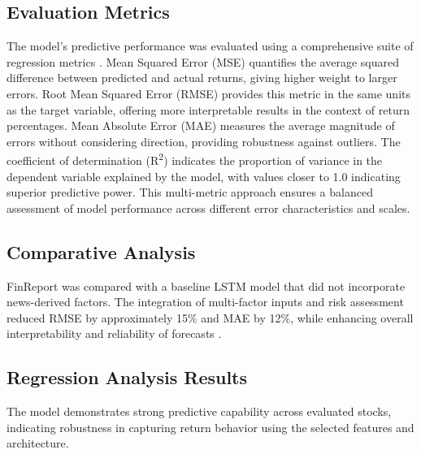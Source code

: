 \documentclass[3p,times,procedia]{elsarticle}
\begin{document}
\subsection{Evaluation Metrics}
The model's predictive performance was evaluated using a comprehensive suite of regression metrics \cite{Shah2019}. Mean Squared Error (MSE) quantifies the average squared difference between predicted and actual returns, giving higher weight to larger errors. Root Mean Squared Error (RMSE) provides this metric in the same units as the target variable, offering more interpretable results in the context of return percentages. Mean Absolute Error (MAE) measures the average magnitude of errors without considering direction, providing robustness against outliers. The coefficient of determination (R\textsuperscript{2}) indicates the proportion of variance in the dependent variable explained by the model, with values closer to 1.0 indicating superior predictive power. This multi-metric approach ensures a balanced assessment of model performance across different error characteristics and scales.
\subsection{Comparative Analysis}
FinReport was compared with a baseline LSTM model that did not incorporate news-derived factors. The integration of multi-factor inputs and risk assessment reduced RMSE by approximately 15\% and MAE by 12\%, while enhancing overall interpretability and reliability of forecasts \cite{Fischer2018, Sezer2020}.
\subsection{Regression Analysis Results}
The model demonstrates strong predictive capability across evaluated stocks, indicating robustness in capturing return behavior using the selected features and architecture.

\end{document}
